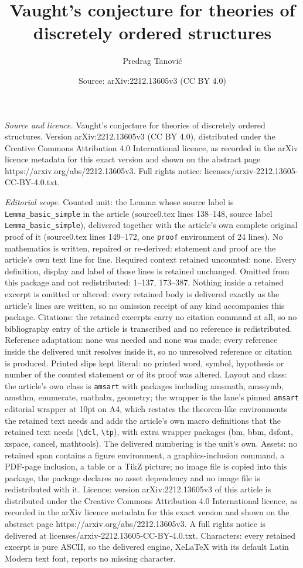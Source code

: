 \documentclass[10pt,a4paper]{amsart}
\title[Vaught's conjecture for theories of discretely ordered struc]{Vaught's conjecture for theories of discretely ordered structures}
\author{Predrag Tanovi\'c}
\date{Source: arXiv:2212.13605v3 (CC BY 4.0)}
\begin{document}
\maketitle

\noindent\emph{Source and licence.} Vaught's conjecture for theories of discretely ordered structures. Version arXiv:2212.13605v3 (CC BY 4.0), distributed under the Creative Commons Attribution 4.0 International licence, as recorded in the arXiv licence metadata for this exact version and shown on the abstract page https://arxiv.org/abs/2212.13605v3. Full rights notice: licenses/arxiv-2212.13605-CC-BY-4.0.txt.\par\smallskip

\noindent\textit{Editorial scope.} Counted unit: the Lemma whose source label is \texttt{Lemma\_basic\_simple} in the article (source0.tex lines 138--148, source label \texttt{Lemma\_basic\_simple}), delivered together with the article's own complete original proof of it (source0.tex lines 149--172, one \texttt{proof} environment of 24 lines). No mathematics is written, repaired or re-derived: statement and proof are the article's own text line for line. Required context retained uncounted: none. Every definition, display and label of those lines is retained unchanged. Omitted from this package and not redistributed: 1--137, 173--387. Nothing inside a retained excerpt is omitted or altered: every retained body is delivered exactly as the article's lines are written, so no omission receipt of any kind accompanies this package. Citations: the retained excerpts carry no citation command at all, so no bibliography entry of the article is transcribed and no reference is redistributed. Reference adaptation: none was needed and none was made; every reference inside the delivered unit resolves inside it, so no unresolved reference or citation is produced. Printed slips kept literal: no printed word, symbol, hypothesis or number of the counted statement or of its proof was altered. Layout and class: the article's own class is \texttt{amsart} with packages including amsmath, amssymb, amsthm, enumerate, mathabx, geometry; the wrapper is the lane's pinned \texttt{amsart} editorial wrapper at 10pt on A4, which restates the theorem-like environments the retained text needs and adds the article's own macro definitions that the retained text needs (\texttt{\textbackslash dcl}, \texttt{\textbackslash tp}), with extra wrapper packages (bm, bbm, dsfont, xspace, cancel, mathtools). The delivered numbering is the unit's own. Assets: no retained span contains a figure environment, a graphics-inclusion command, a PDF-page inclusion, a table or a TikZ picture; no image file is copied into this package, the package declares no asset dependency and no image file is redistributed with it. Licence: version arXiv:2212.13605v3 of this article is distributed under the Creative Commons Attribution 4.0 International licence, as recorded in the arXiv licence metadata for this exact version and shown on the abstract page https://arxiv.org/abs/2212.13605v3. A full rights notice is delivered at licenses/arxiv-2212.13605-CC-BY-4.0.txt. Characters: every retained excerpt is pure ASCII, so the delivered engine, XeLaTeX with its default Latin Modern text font, reports no missing character.
\end{document}
